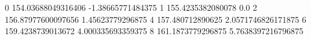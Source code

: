 0 154.03688049316406 -1.38665771484375
1 155.4235382080078 0.0
2 156.87977600097656 1.45623779296875
4 157.480712890625 2.0571746826171875
6 159.4238739013672 4.000335693359375
8 161.1873779296875 5.7638397216796875
